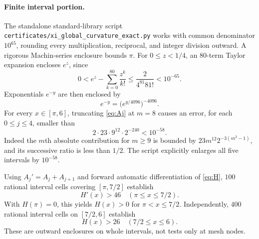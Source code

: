 \paragraph{Finite interval portion.}
The standalone standard-library script
\texttt{certificates/xi\_global\_curvature\_exact.py}
works with common denominator $10^{65}$,
rounding every multiplication, reciprocal,
and integer division outward. A rigorous
Machin-series enclosure bounds $\pi$.
For $0\le z<1/4$, an 80-term Taylor
expansion encloses $e^z$, since
\[
0<e^z-\sum_{k=0}^{80}\frac{z^k}{k!}
 \le \frac{2}{4^{81}81!}<10^{-65}.
\]
Exponentials $e^{-y}$ are then enclosed by
\[
e^{-y}=\bigl(e^{y/4096}\bigr)^{-4096}.
\]
For every $x\in[\pi,6]$, truncating
\eqref{eq:Aj} at $m=8$ causes an error,
for each $0\le j\le4$, smaller than
\[
2\cdot23\cdot9^{12}\cdot2^{-240}
<10^{-58}.
\]
Indeed the $m$th absolute contribution
for $m\ge9$ is bounded by
$23m^{12}2^{-3(m^2-1)}$, and its
successive ratio is less than $1/2$.
The script explicitly enlarges all five
intervals by $10^{-58}$.

Using $A_j'=A_j+A_{j+1}$ and
forward automatic differentiation of
\eqref{eq:H}, $100$ rational interval cells
covering $[\pi,7/2]$ establish
\begin{equation}
\boxed{H'(x)>46\quad(\pi\le x\le7/2).}
\label{eq:Hprimebound}
\end{equation}
With $H(\pi)=0$, this yields $H(x)>0$
for $\pi<x\le7/2$. Independently,
$400$ rational interval cells on $[7/2,6]$
establish
\begin{equation}
\boxed{H(x)>26\quad(7/2\le x\le6).}
\label{eq:Hcompactbound}
\end{equation}
These are outward enclosures on whole
intervals, not tests only at mesh nodes.


